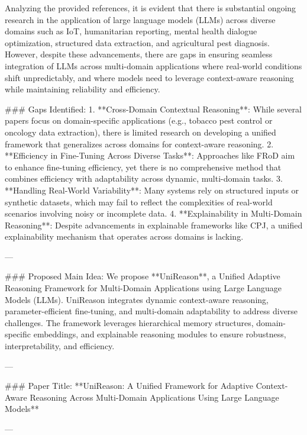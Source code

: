 Analyzing the provided references, it is evident that there is substantial ongoing research in the application of large language models (LLMs) across diverse domains such as IoT, humanitarian reporting, mental health dialogue optimization, structured data extraction, and agricultural pest diagnosis. However, despite these advancements, there are gaps in ensuring seamless integration of LLMs across multi-domain applications where real-world conditions shift unpredictably, and where models need to leverage context-aware reasoning while maintaining reliability and efficiency.

### Gaps Identified:
1. **Cross-Domain Contextual Reasoning**: While several papers focus on domain-specific applications (e.g., tobacco pest control or oncology data extraction), there is limited research on developing a unified framework that generalizes across domains for context-aware reasoning.
2. **Efficiency in Fine-Tuning Across Diverse Tasks**: Approaches like FRoD aim to enhance fine-tuning efficiency, yet there is no comprehensive method that combines efficiency with adaptability across dynamic, multi-domain tasks.
3. **Handling Real-World Variability**: Many systems rely on structured inputs or synthetic datasets, which may fail to reflect the complexities of real-world scenarios involving noisy or incomplete data.
4. **Explainability in Multi-Domain Reasoning**: Despite advancements in explainable frameworks like CPJ, a unified explainability mechanism that operates across domains is lacking.

---

### Proposed Main Idea:
We propose **UniReason**, a Unified Adaptive Reasoning Framework for Multi-Domain Applications using Large Language Models (LLMs). UniReason integrates dynamic context-aware reasoning, parameter-efficient fine-tuning, and multi-domain adaptability to address diverse challenges. The framework leverages hierarchical memory structures, domain-specific embeddings, and explainable reasoning modules to ensure robustness, interpretability, and efficiency.

---

### Paper Title:
**UniReason: A Unified Framework for Adaptive Context-Aware Reasoning Across Multi-Domain Applications Using Large Language Models**

---

